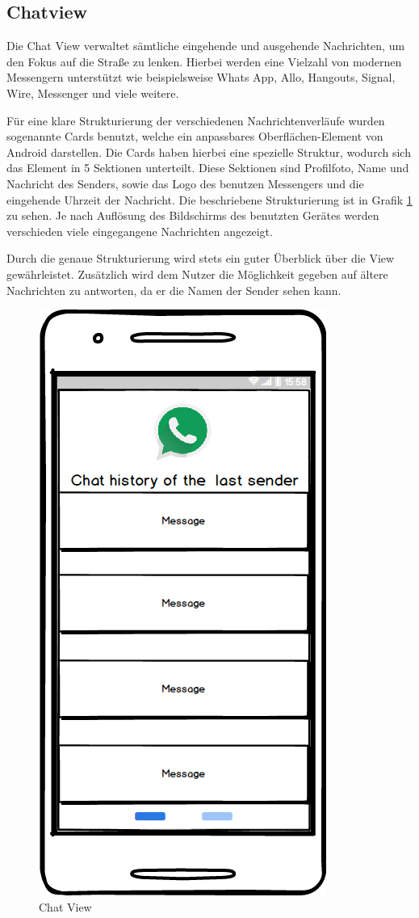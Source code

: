 \subsection{Chatview}
Die Chat View verwaltet sämtliche eingehende und ausgehende Nachrichten, um den Fokus auf die Straße zu lenken. Hierbei werden eine Vielzahl von modernen Messengern unterstützt wie beispielsweise Whats App, Allo, Hangouts, Signal, Wire, Messenger und viele weitere. 

Für eine klare Strukturierung der verschiedenen Nachrichtenverläufe wurden sogenannte Cards benutzt, welche ein anpassbares Oberflächen-Element von Android darstellen. Die Cards haben hierbei eine spezielle Struktur, wodurch sich das Element in 5 Sektionen unterteilt. Diese Sektionen sind Profilfoto, Name und Nachricht des Senders, sowie das Logo des benutzen Messengers und die eingehende Uhrzeit der Nachricht. Die beschriebene Strukturierung ist in Grafik \ref{figChatView} zu sehen. Je nach Auflösung des Bildschirms des benutzten Gerätes werden verschieden viele eingegangene Nachrichten angezeigt.

Durch die genaue Strukturierung wird stets ein guter Überblick über die View gewährleistet. Zusätzlich wird dem Nutzer die Möglichkeit gegeben auf ältere Nachrichten zu antworten, da er die Namen der Sender sehen kann. 

\begin{figure}[h]
	\centering
  \includegraphics[scale=0.5]{images/WhatsAPP.png}
	\caption{Chat View}
	\label{figChatView}
\end{figure}

